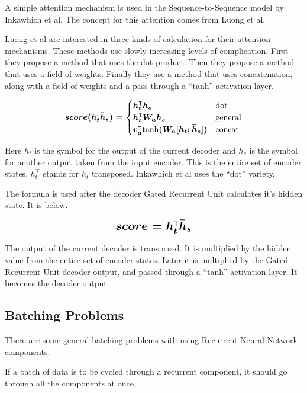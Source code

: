A simple attention mechanism is used in the Sequence-to-Sequence model by Inkawhich et al. \cite{2018Inkawhich} The concept for this attention comes from Luong et al. \cite{DBLP:journals/corr/LuongPM15}

Luong et al \cite{DBLP:journals/corr/LuongPM15} are interested in three kinds of calculation for their attention mechanisms. These methods use slowly increasing levels of complication. First they propose a method that uses the dot-product. Then they propose a method that uses a field of weights. Finally they use a method that uses concatenation, along with a field of weights and a pass through a ``tanh'' activation layer.

$$
\boldmath
score(h_t^ \text{,} \bar{h}_s) =
\begin{cases}
    h_t^\intercal \bar{h}_s & \text{dot} \\
	h_t^\intercal W_a \bar{h}_s & \text{general} \\
	v_a^\intercal \text{tanh}(W_a [h_t ; \bar{h}_s] ) & \text{concat}
\end{cases}
\unboldmath
$$

Here $h_t$ is the symbol for the output of the current decoder and $\bar{h}_s $ is the symbol for another output taken from the input encoder. This is the entire set of encoder states. $h_t^\intercal$ stands for $h_t$ transposed. Inkawhich et al \cite{2018Inkawhich} uses the ``dot'' variety.

The formula is used after the decoder Gated Recurrent Unit calculates it's hidden state. It is below.

$$ 
\boldmath
\mathlarger{ \mathlarger{
score = h_t^\intercal \bar{h}_s 
} }
\unboldmath
$$ 

The output of the current decoder is transposed. It is multiplied by the hidden value from the entire set of encoder states. Later it is multiplied by the Gated Recurrent Unit decoder output, and passed through a ``tanh'' activation layer. It becomes the decoder output.

\subsection{Batching Problems}

\label{section-gru-batching-problems}

There are some general batching problems with using Recurrent Neural Network components.

If a batch of data is to be cycled through a recurrent component, it should go through all the components at once.  



